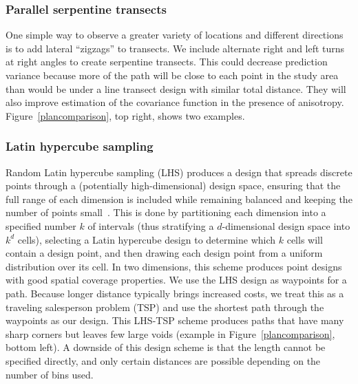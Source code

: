 \documentclass[review]{elsarticle}
\begin{document}
\subsubsection{Parallel serpentine transects}

One simple way to observe a greater variety of locations and different
directions is to add lateral ``zigzags'' to transects. We include alternate
right and left turns at right angles to create serpentine transects. This could
decrease prediction variance because more of the path will be close to each
point in the study area than would be under a line transect design with similar
total distance. They will also improve estimation of the covariance function
in the presence of anisotropy. Figure~\ref{plancomparison}, top right, shows
two examples.



\subsubsection{Latin hypercube sampling}

Random Latin hypercube sampling (LHS) produces a design that spreads discrete
points through a (potentially high-dimensional) design space, ensuring that
the full range of each dimension is included while remaining balanced and
keeping the number of points small~\citep{mckayetal}. This is done by
partitioning each dimension into a specified number \(k\) of intervals (thus
stratifying a \(d\)-dimensional design space into \(k^{d}\) cells), selecting
a Latin hypercube design to determine which \(k\) cells will contain a design
point, and then drawing each design point from a uniform distribution over its
cell. In two dimensions, this scheme produces point designs with good spatial
coverage properties. We use the LHS design as waypoints for a path. Because
longer distance typically brings increased costs, we treat this as a traveling
salesperson problem (TSP) and use the shortest path through the waypoints as
our design. This LHS-TSP scheme produces paths that have many sharp corners but
leaves few large voids (example in Figure~\ref{plancomparison}, bottom left). A
downside of this design scheme is that the length cannot be specified directly,
and only certain distances are possible depending on the number of bins used.
\end{document}
